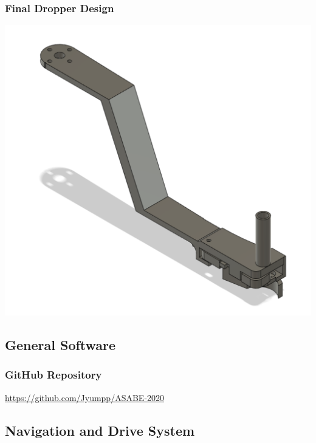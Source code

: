 \documentclass[11pt, hidelinks]{report}
\begin{document}
\subsubsection{Final Dropper Design} \label{app:Dropper}
	\begin{center}
	    \includegraphics[scale=.4]{Dropper.png}
	\end{center}

\subsection{General Software} \label{app:software}
\subsubsection{GitHub Repository} \label{app:github}
	\begin{center}
	    \url{https://github.com/Jyumpp/ASABE-2020}
	\end{center}

\subsection{Navigation and Drive System} \label{app:nav}
\end{document}
